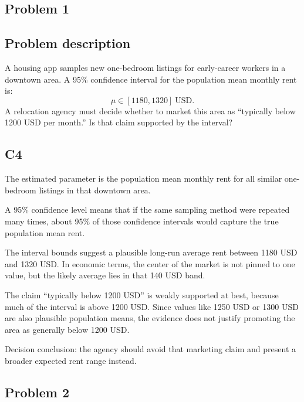 


	\begin{ExamProblems}
		\item
		\subsection*{Problem 1}
		\subsection*{Problem description}
		A housing app samples new one-bedroom listings for early-career workers in a downtown area.
		A 95\% confidence interval for the population mean monthly rent is:
		\[
		\mu \in [1180, 1320]\ \text{USD}.
		\]
		A relocation agency must decide whether to market this area as ``typically below 1200 USD per month.''
		Is that claim supported by the interval?

		\subsection*{C4}
		The estimated parameter is the population mean monthly rent for all similar one-bedroom listings in that downtown area.

		A 95\% confidence level means that if the same sampling method were repeated many times, about 95\% of those confidence intervals would capture the true population mean rent.

		The interval bounds suggest a plausible long-run average rent between 1180 USD and 1320 USD.
		In economic terms, the center of the market is not pinned to one value, but the likely average lies in that 140 USD band.

		The claim ``typically below 1200 USD'' is weakly supported at best, because much of the interval is above 1200 USD.
		Since values like 1250 USD or 1300 USD are also plausible population means, the evidence does not justify promoting the area as generally below 1200 USD.

		Decision conclusion: the agency should avoid that marketing claim and present a broader expected rent range instead.

		\newpage
		\item
		\subsection*{Problem 2}

\end{ExamProblems}
